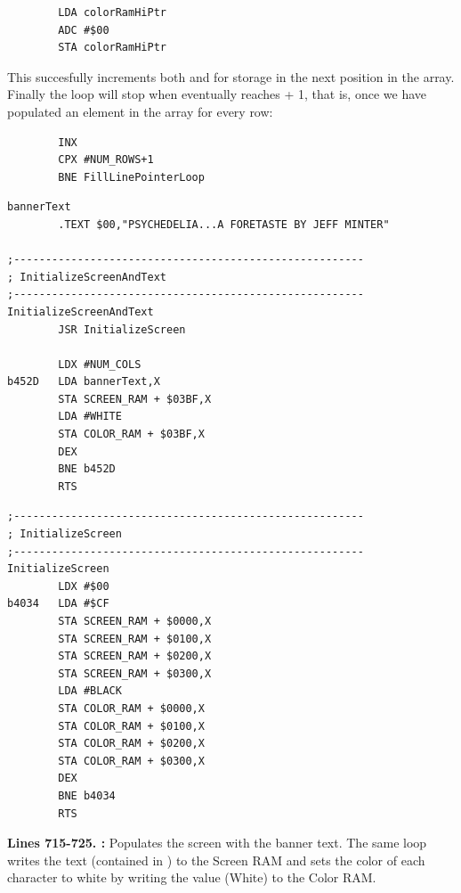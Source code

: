 {\begin{lstlisting}
        LDA colorRamHiPtr
        ADC #$00
        STA colorRamHiPtr
\end{lstlisting}

This succesfully increments both  and  for storage in the next position in
the array. Finally the loop will stop when  eventually reaches  + 1, that is, once we have
populated an element in the array for every row:

\begin{lstlisting}
        INX 
        CPX #NUM_ROWS+1
        BNE FillLinePointerLoop
\end{lstlisting}
%

\clearpage
\begin{lstlisting}[caption = A routine that fills the screen with black and the title text.]
bannerText   
        .TEXT $00,"PSYCHEDELIA...A FORETASTE BY JEFF MINTER"

;-------------------------------------------------------
; InitializeScreenAndText
;-------------------------------------------------------
InitializeScreenAndText   
        JSR InitializeScreen

        LDX #NUM_COLS
b452D   LDA bannerText,X
        STA SCREEN_RAM + $03BF,X
        LDA #WHITE
        STA COLOR_RAM + $03BF,X
        DEX 
        BNE b452D
        RTS 
\end{lstlisting}

\bigskip
\bigskip
\bigskip
\bigskip
\bigskip
\bigskip
\bigskip
\bigskip
\bigskip
\begin{lstlisting}[caption = Fills the screen with black]
;-------------------------------------------------------
; InitializeScreen
;-------------------------------------------------------
InitializeScreen   
        LDX #$00
b4034   LDA #$CF
        STA SCREEN_RAM + $0000,X
        STA SCREEN_RAM + $0100,X
        STA SCREEN_RAM + $0200,X
        STA SCREEN_RAM + $0300,X
        LDA #BLACK
        STA COLOR_RAM + $0000,X
        STA COLOR_RAM + $0100,X
        STA COLOR_RAM + $0200,X
        STA COLOR_RAM + $0300,X
        DEX 
        BNE b4034
        RTS 

\end{lstlisting}
\clearpage

\textbf{Lines 715-725. :} Populates the screen with the banner text. The same loop writes
the text (contained in ) to the Screen RAM and sets the color of each character to white by writing the
value  (White) to the Color RAM.

}

